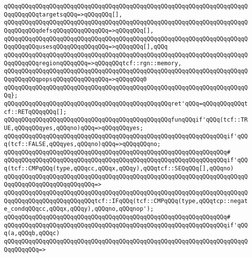 \verb|qQQqqQQqqQQqqQQqqQQqqQQqqQQqqQQqqQQqqQQqqQQqqQQqqQQqqQQqqQQqqQQqqQQqqQQqqQQqqQQqtargetsqQQq=>qQQqqQQq[],|\newline
\verb|qQQqqQQqqQQqqQQqqQQqqQQqqQQqqQQqqQQqqQQqqQQqqQQqqQQqqQQqqQQqqQQqqQQqqQQqqQQqqQQqdefsqQQqqQQqqQQqqQQq=>qQQqqQQq[],|\newline
\verb|qQQqqQQqqQQqqQQqqQQqqQQqqQQqqQQqqQQqqQQqqQQqqQQqqQQqqQQqqQQqqQQqqQQqqQQqqQQqqQQqusesqQQqqQQqqQQqqQQq=>qQQqqQQq[],qQQq|\newline
\verb|qQQqqQQqqQQqqQQqqQQqqQQqqQQqqQQqqQQqqQQqqQQqqQQqqQQqqQQqqQQqqQQqqQQqqQQqqQQqqQQqregionqQQqqQQq=>qQQqqQQqtcf::rgn::memory,|\newline
\verb|qQQqqQQqqQQqqQQqqQQqqQQqqQQqqQQqqQQqqQQqqQQqqQQqqQQqqQQqqQQqqQQqqQQqqQQqqQQqqQQqpopsqQQqqQQqqQQqqQQq=>qQQqqQQq0|\newline
\verb|qQQqqQQqqQQqqQQqqQQqqQQqqQQqqQQqqQQqqQQqqQQqqQQqqQQqqQQqqQQqqQQqqQQqqQQq};|\newline
\newline
\verb|qQQqqQQqqQQqqQQqqQQqqQQqqQQqqQQqqQQqqQQqqQQqqQQqret'qQQq=qQQqqQQqqQQqtcf::RETqQQqqQQq[];|\newline
\newline
\verb|qQQqqQQqqQQqqQQqqQQqqQQqqQQqqQQqqQQqqQQqqQQqqQQqfunqQQqif'qQQq(tcf::TRUE,qQQqqQQqyes,qQQqno)qQQq=>qQQqqQQqyes;|\newline
\verb|qQQqqQQqqQQqqQQqqQQqqQQqqQQqqQQqqQQqqQQqqQQqqQQqqQQqqQQqqQQqqQQqif'qQQq(tcf::FALSE,qQQqyes,qQQqno)qQQq=>qQQqqQQqno;|\newline
\verb|qQQqqQQqqQQqqQQqqQQqqQQqqQQqqQQqqQQqqQQqqQQqqQQqqQQqqQQqqQQqqQQq#|\newline
\verb|qQQqqQQqqQQqqQQqqQQqqQQqqQQqqQQqqQQqqQQqqQQqqQQqqQQqqQQqqQQqqQQqif'qQQq(tcf::CMPqQQq(type,qQQqcc,qQQqx,qQQqy),qQQqtcf::SEQqQQq[],qQQqno)|\newline
\verb|qQQqqQQqqQQqqQQqqQQqqQQqqQQqqQQqqQQqqQQqqQQqqQQqqQQqqQQqqQQqqQQqqQQqqQQqqQQqqQQqqQQqqQQqqQQqqQQq=>|\newline
\verb|qQQqqQQqqQQqqQQqqQQqqQQqqQQqqQQqqQQqqQQqqQQqqQQqqQQqqQQqqQQqqQQqqQQqqQQqqQQqqQQqqQQqqQQqqQQqqQQqtcf::IFqQQq(tcf::CMPqQQq(type,qQQqtcp::negate_condqQQqcc,qQQqx,qQQqy),qQQqno,qQQqnop');|\newline
\verb|qQQqqQQqqQQqqQQqqQQqqQQqqQQqqQQqqQQqqQQqqQQqqQQqqQQqqQQqqQQqqQQq#|\newline
\verb|qQQqqQQqqQQqqQQqqQQqqQQqqQQqqQQqqQQqqQQqqQQqqQQqqQQqqQQqqQQqqQQqif'qQQq(a,qQQqb,qQQqc)|\newline
\verb|qQQqqQQqqQQqqQQqqQQqqQQqqQQqqQQqqQQqqQQqqQQqqQQqqQQqqQQqqQQqqQQqqQQqqQQqqQQqqQQq=>|\newline
